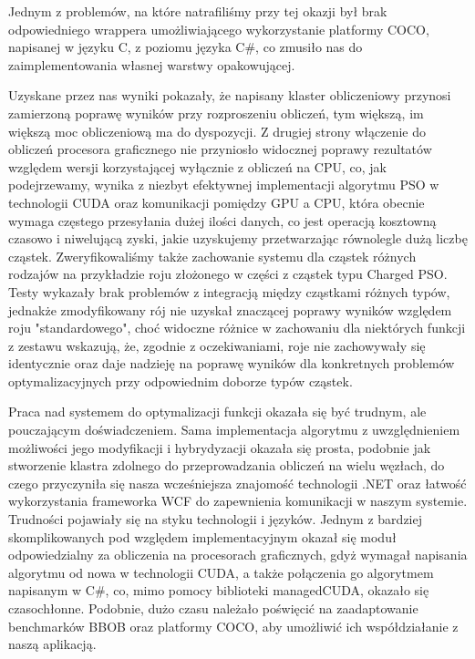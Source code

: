 \documentclass[12pt, twoside, openany, abstract=on]{report}
\theoremstyle{definition}
\begin{document}
Jednym z problemów, na które natrafiliśmy przy tej okazji był brak odpowiedniego wrappera umożliwiającego wykorzystanie platformy COCO, napisanej w języku C, z poziomu języka C\#, co zmusiło nas do zaimplementowania własnej warstwy opakowującej.

Uzyskane przez nas wyniki pokazały, że napisany klaster obliczeniowy przynosi zamierzoną poprawę wyników przy rozproszeniu obliczeń, tym większą, im większą moc obliczeniową ma do dyspozycji. 
	Z drugiej strony włączenie do obliczeń procesora graficznego nie przyniosło widocznej poprawy rezultatów względem wersji korzystającej wyłącznie z obliczeń na CPU, co, jak podejrzewamy, wynika z niezbyt efektywnej implementacji algorytmu PSO w technologii CUDA oraz komunikacji pomiędzy GPU a CPU, która obecnie wymaga częstego przesyłania dużej ilości danych, co jest operacją kosztowną czasowo i niwelującą zyski, jakie uzyskujemy przetwarzając równolegle dużą liczbę cząstek.
	Zweryfikowaliśmy także zachowanie systemu dla cząstek różnych rodzajów na przykładzie roju złożonego w części z cząstek typu Charged PSO. Testy wykazały brak problemów z integracją między cząstkami różnych typów, jednakże zmodyfikowany rój nie uzyskał znaczącej poprawy wyników względem roju "standardowego", choć widoczne różnice w zachowaniu dla niektórych funkcji z zestawu wskazują, że, zgodnie z oczekiwaniami, roje nie zachowywały się identycznie oraz daje nadzieję na poprawę wyników dla konkretnych problemów optymalizacyjnych przy odpowiednim doborze typów cząstek.



Praca nad systemem do optymalizacji funkcji okazała się być trudnym, ale pouczającym doświadczeniem. 
	Sama implementacja algorytmu z uwzględnieniem możliwości jego modyfikacji i hybrydyzacji okazała się prosta, podobnie jak stworzenie klastra zdolnego do przeprowadzania obliczeń na wielu węzłach, do czego przyczyniła się nasza wcześniejsza znajomość technologii .NET oraz łatwość wykorzystania frameworka WCF do zapewnienia komunikacji w naszym systemie.
	Trudności pojawiały się na styku technologii i języków. Jednym z bardziej skomplikowanych pod względem implementacyjnym okazał się moduł odpowiedzialny za obliczenia na procesorach graficznych, gdyż wymagał napisania algorytmu od nowa w technologii CUDA, a także połączenia go algorytmem napisanym w C\#, co, mimo pomocy biblioteki managedCUDA, okazało się czasochłonne.
	Podobnie, dużo czasu należało poświęcić na zaadaptowanie benchmarków BBOB oraz platformy COCO, aby umożliwić ich współdziałanie z naszą aplikacją.
\end{document}
